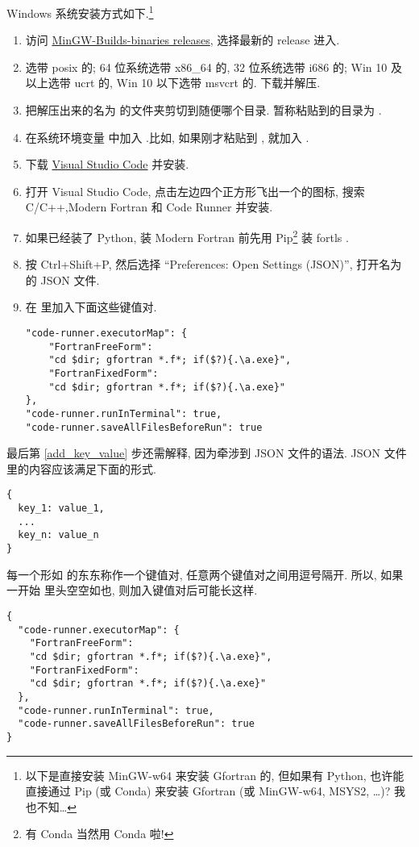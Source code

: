 Windows 系统安装方式如下.\footnote{
    以下是直接安装 MinGW-w64 来安装 Gfortran 的, 但如果有 Python, 也许能直接通过 Pip (或 Conda) 来安装 Gfortran (或 MinGW-w64, MSYS2, \dots{})? 我也不知\dots{}
}
\begin{enumerate}
    \item 访问 \href{https://github.com/niXman/mingw-builds-binaries/releases}
    {MinGW-Builds-binaries releases}, 选择最新的 release 进入.
    \item 选带 posix 的; 64 位系统选带 x86\_{}64 的, 32 位系统选带 i686 的; Win 10 及以上选带 ucrt 的, Win 10 以下选带 msvcrt 的. 下载并解压.
    \item 把解压出来的名为  的文件夹剪切到随便哪个目录. 暂称粘贴到的目录为 \ttt{[dir]}.
    \item 在系统环境变量  中加入 .比如, 如果刚才粘贴到 , 就加入 .
    \item 下载 \href{https://code.visualstudio.com/sha/download?build=stable&os=win32-x64-user}{Visual Studio Code} 并安装.
    \item 打开 Visual Studio Code, 点击左边四个正方形飞出一个的图标, 搜索 C/C++,Modern Fortran 和 Code Runner 并安装.
    \item[] 如果已经装了 Python, 装 Modern Fortran 前先用 Pip\footnote{有 Conda 当然用 Conda 啦!} 装 fortls .
    \item 按 Ctrl+Shift+P, 然后选择 ``Preferences: Open Settings (JSON)'', 打开名为  的 JSON 文件.
    \item 在  里加入下面这些键值对.\label{add_key_value}
    \begin{verbatim}
"code-runner.executorMap": {
    "FortranFreeForm":
    "cd $dir; gfortran *.f*; if($?){.\a.exe}",
    "FortranFixedForm":
    "cd $dir; gfortran *.f*; if($?){.\a.exe}"
},
"code-runner.runInTerminal": true,
"code-runner.saveAllFilesBeforeRun": true
    \end{verbatim}
\end{enumerate}
最后第 \ref{add_key_value} 步还需解释, 因为牵涉到 JSON 文件的语法. JSON 文件里的内容应该满足下面的形式.
\begin{verbatim}
{
  key_1: value_1,
  ...
  key_n: value_n
}
\end{verbatim}
每一个形如  的东东称作一个键值对, 任意两个键值对之间用逗号隔开. 所以, 如果一开始  里头空空如也, 则加入键值对后可能长这样.
\begin{verbatim}
{
  "code-runner.executorMap": {
    "FortranFreeForm":
    "cd $dir; gfortran *.f*; if($?){.\a.exe}",
    "FortranFixedForm":
    "cd $dir; gfortran *.f*; if($?){.\a.exe}"
  },
  "code-runner.runInTerminal": true,
  "code-runner.saveAllFilesBeforeRun": true
}
\end{verbatim}
